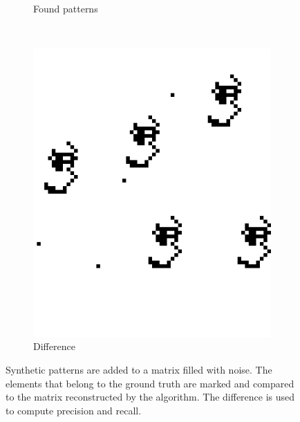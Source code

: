 \documentclass{llncs}
\begin{document}
\begin{figure}[p]
\begin{subfigure}[t]{0.25\textwidth}
\caption{Found patterns}
\label{fig:rilc}
\end{subfigure}%
~
\begin{subfigure}[t]{0.25\textwidth}
\centering
\includegraphics[scale=.9]{img/exp_diff_2_cropped.png}
\caption{Difference}
\label{fig:rild}
\end{subfigure}%
\caption{Synthetic patterns are added to a matrix filled with noise. The elements that belong to the ground truth are marked and compared to the matrix reconstructed by the algorithm. The difference is used to compute precision and recall.}
\label{fig:ril}
\end{figure}  
\end{document}
